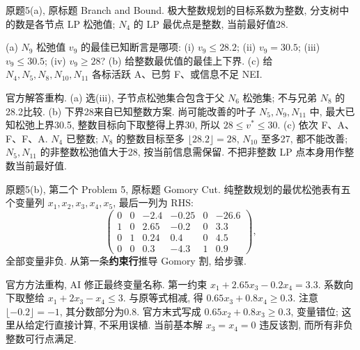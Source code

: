 \begin{exercise}\label{ass:15053-practice-q5a}
原题5(a), 原标题 Branch and Bound. 极大整数规划的目标系数为整数, 分支树中的数是各节点 LP 松弛值; $N_4$ 的 LP 最优点是整数, 当前最好值28.
\begin{center}\end{center}
(a) $N_9$ 松弛值 $v_9$ 的最佳已知断言是哪项: (i) $v_9\le28.2$; (ii) $v_9=30.5$; (iii) $v_9\le30.5$; (iv) $v_9\ge28$?
(b) 给整数最优值的最佳上下界.
(c) 给 $N_4,N_5,N_8,N_{10},N_{11}$ 各标活跃 A、已剪 F、或信息不足 NEI.
\end{exercise}
\begin{solution}
官方解答重构. (a) 选(iii), 子节点松弛集合包含于父 $N_6$ 松弛集; 不与兄弟 $N_8$ 的28.2比较. (b) 下界28来自已知整数方案. 尚可能改善的叶子 $N_5,N_9,N_{11}$ 中, 最大已知松弛上界30.5, 整数目标向下取整得上界30, 所以 $28\le v^*\le30$. (c) 依次 F、A、F、F、A. $N_4$ 已整数; $N_8$ 的整数目标至多 $\lfloor28.2\rfloor=28$, $N_{10}$ 至多27, 都不能改善; $N_5,N_{11}$ 的非整数松弛值大于28, 按当前信息需保留. 不把非整数 LP 点本身用作整数当前最好值.
\end{solution}

\begin{exercise}\label{ass:15053-practice-q5b}
原题5(b), 第二个 Problem 5, 原标题 Gomory Cut. 纯整数规划的最优松弛表有五个变量列 $x_1,x_2,x_3,x_4,x_5$, 最后一列为 RHS:
\[
\begin{pmatrix}0&0&-2.4&-0.25&0&-26.6\\1&0&2.65&-0.2&0&3.3\\0&1&0.24&0.4&0&4.5\\0&0&0.3&-4.3&1&0.9\end{pmatrix},
\]
全部变量非负. 从第一条\textbf{约束行}推导 Gomory 割, 给步骤.
\end{exercise}
\begin{solution}
官方方法重构, AI 修正最终变量名称. 第一约束 $x_1+2.65x_3-0.2x_4=3.3$. 系数向下取整给 $x_1+2x_3-x_4\le3$. 与原等式相减, 得
$0.65x_3+0.8x_4\ge0.3$. 注意 $\lfloor-0.2\rfloor=-1$, 其分数部分为0.8. 官方末式写成 $0.65x_2+0.8x_3\ge0.3$, 变量错位; 这里从给定行直接计算, 不采用误植. 当前基本解 $x_3=x_4=0$ 违反该割, 而所有非负整数可行点满足.
\end{solution}
